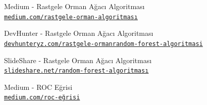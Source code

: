 \documentclass[conference]{IEEEtran}
\begin{document}
\begin{thebibliography}{6}
Medium - Rastgele Orman Ağacı Algoritması
\\\texttt{\href{https://medium.com/@cemthecebi/rastgele-orman-algoritması-1600ca4f4784}{\nolinkurl{medium.com/rastgele-orman-algoritması}}}

DevHunter - Rastgele Orman Ağacı Algoritması
\\\texttt{\href{https://devhunteryz.wordpress.com/2018/09/20/rastgele-ormanrandom-forest-algoritmasi/comment-page-1}{\nolinkurl{devhunteryz.com/rastgele-ormanrandom-forest-algoritmasi}}}

SlideShare - Rastgele Orman Ağacı Algoritması
\\\texttt{\href{https://www.slideshare.net/SezerFidanc/random-forest-algoritmas}{\nolinkurl{slideshare.net/random-forest-algoritması}}}

Medium - ROC Eğrisi
\\\texttt{\href{https://bernatas.medium.com/roc-eğrisi-ve-eğri-altında-kalan-alan-auc-97b058e8e0cf}{\nolinkurl{medium.com/roc-eğrisi}}}


\end{thebibliography}
\end{document}
